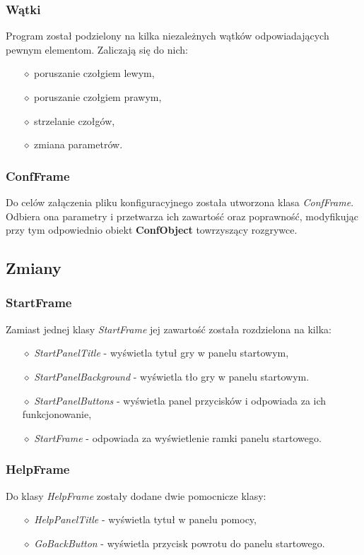 \documentclass[a4paper]{article}
\begin{document}
\subsubsection{W\k{a}tki}
\quad Program zosta\l{} podzielony na kilka niezale\.znych w\k{a}tk\'ow odpowiadaj\k{a}cych pewnym elementom. Zaliczaj\k{a} si\k{e} do nich:
\begin{itemize}
    \item[$\diamond$] poruszanie czo\l{}giem lewym,
    \item[$\diamond$] poruszanie czo\l{}giem prawym,
    \item[$\diamond$] strzelanie czo\l{}g\'ow,
    \item[$\diamond$] zmiana parametr\'ow. 
\end{itemize}

\subsubsection{ConfFrame}
\quad Do cel\'ow za\l{}\k{a}czenia pliku konfiguracyjnego zosta\l{}a utworzona klasa \textit{ConfFrame}.
Odbiera ona parametry i przetwarza ich zawarto\'s\'c oraz poprawno\'s\'c, modyfikuj\k{a}c przy tym odpowiednio obiekt \textbf{ConfObject} towrzysz\k{a}cy rozgrywce.

\subsection{Zmiany}

\subsubsection{StartFrame}

\quad Zamiast jednej klasy \textit{StartFrame} jej zawarto\'s\'c zosta\l{}a rozdzielona na kilka:
\begin{itemize}
    \item[$\diamond$] \textit{StartPanelTitle} - wy\'swietla tytu\l{} gry w panelu startowym,
    \item[$\diamond$] \textit{StartPanelBackground} - wy\'swietla t\l{}o gry w panelu startowym.
    \item[$\diamond$] \textit{StartPanelButtons} - wy\'swietla panel przycisk\'ow i odpowiada za ich funkcjonowanie,
    \item[$\diamond$] \textit{StartFrame} - odpowiada za wy\'swietlenie ramki panelu startowego. 
\end{itemize}

\subsubsection{HelpFrame}
\quad Do klasy \textit{HelpFrame} zosta\l{}y dodane dwie pomocnicze klasy:
\begin{itemize}
    \item[$\diamond$] \textit{HelpPanelTitle} - wy\'swietla tytu\l{} w panelu pomocy,
    \item[$\diamond$] \textit{GoBackButton} - wy\'swietla przycisk powrotu do panelu startowego.
\end{itemize}
\end{document}
